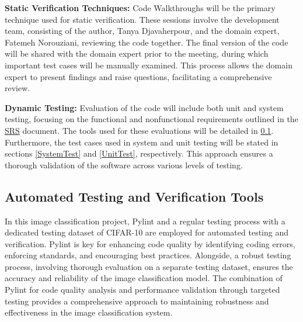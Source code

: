 \documentclass[12pt, titlepage]{article}
\begin{document}
\begin{inparaitem}
  \item \textbf{Static Verification Techniques:}
  Code Walkthroughs will be the primary technique used for static verification. 
  These sessions involve the development team, consisting of the author, Tanya Djavaherpour, 
  and the domain expert, Fatemeh Norouziani, reviewing the code together. 
  The final version of the code will be shared with the domain expert prior 
  to the meeting, during which important test cases will be manually examined. 
  This process allows the domain expert to present findings and raise questions, 
  facilitating a comprehensive review.

  \item \textbf{Dynamic Testing:}
  Evaluation of the code will include both unit and system testing, focusing on 
  the functional and nonfunctional requirements outlined in the
  \href{https://github.com/tanya-jp/ANN-CAS741/blob/main/docs/SRS/SRS.pdf}{SRS} document.
  The tools used for these evaluations will be detailed in \ref{AutoTestVerTools}. Furthermore, the test cases 
  used in system and unit testing will be stated in sections \ref{SystemTest} and \ref{UnitTest}, respectively.
  This approach ensures a thorough validation of the software across various levels of testing.

\end{inparaitem}



\subsection{Automated Testing and Verification Tools}\label{AutoTestVerTools}

In this image classification project, Pylint \cite{pylint} and a regular testing process with a 
dedicated testing dataset of CIFAR-10 \cite{CIFAR10} are employed for automated testing and verification. 
Pylint \cite{pylint} is key for enhancing code quality by identifying coding errors, 
enforcing standards, and encouraging best practices. Alongside, a robust 
testing process, involving thorough evaluation on a separate testing dataset, 
ensures the accuracy and reliability of the image classification model. The combination of 
Pylint \cite{pylint} for code quality analysis and performance validation through targeted testing 
provides a comprehensive approach to maintaining robustness and effectiveness in the 
image classification system.
\end{document}
